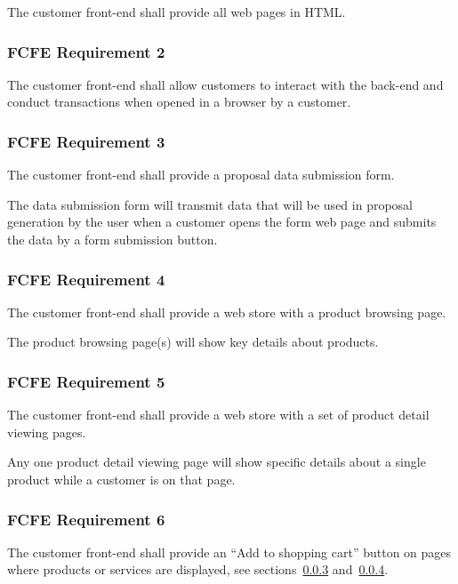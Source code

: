 \documentclass{article}
\begin{document}
The customer front-end shall provide all web pages in HTML.

\subsubsection{FCFE Requirement 2}
\label{func-cust-front-end-2}

The customer front-end shall allow customers to interact with the
back-end and conduct transactions when opened in a browser by a customer.

\subsubsection{FCFE Requirement 3}
\label{func-cust-front-end-3}

The customer front-end shall provide a proposal data submission form.

The data submission form will transmit data that will be used in proposal
generation by the user when a customer opens the form web page and submits the
data by a form submission button.

\subsubsection{FCFE Requirement 4}
\label{func-cust-front-end-4}

The customer front-end shall provide a web store with a product browsing page.

The product browsing page(s) will show key details about products.

\subsubsection{FCFE Requirement 5}
\label{func-cust-front-end-5}

The customer front-end shall provide a web store with a set of product detail
viewing pages.

Any one product detail viewing page will show specific details about a single
product while a customer is on that page.

\subsubsection{FCFE Requirement 6}
\label{func-cust-front-end-6}

The customer front-end shall provide an ``Add to shopping cart'' button on pages
where products or services are displayed, see
sections~\ref{func-cust-front-end-4} and~\ref{func-cust-front-end-5}.
\end{document}
